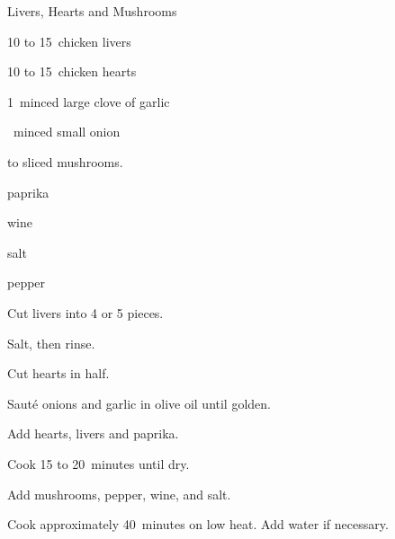 \begin{recipe}{Livers, Hearts and Mushrooms}{}{}

\begin{ingredients}
\item 10 to 15~chicken livers
\item 10 to 15~chicken hearts
\item 1~minced large clove of garlic
\item \half{}~minced small onion
\item \threequarter to  sliced mushrooms.
\item \tp{\half} paprika
\item wine
\item salt
\item pepper
\end{ingredients}

\begin{directions}
\item Cut livers into 4 or 5 pieces.
\item Salt, then rinse.
\item Cut hearts in half.
\item Saut\'e onions and garlic in olive oil until golden.
\item Add hearts, livers and paprika.
\item Cook 15 to 20~minutes until dry.
\item Add mushrooms, pepper, wine, and salt.
\item Cook approximately 40~minutes on low heat. Add water if necessary.
\end{directions}

\end{recipe}
